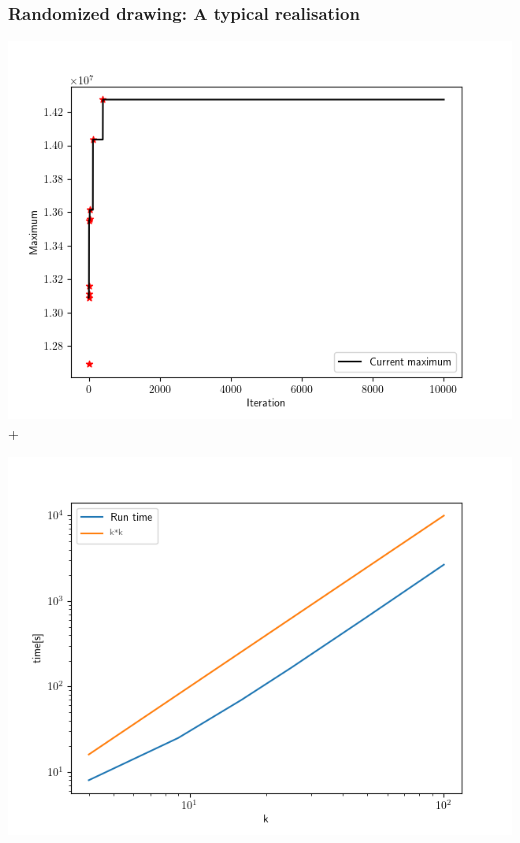 \documentclass[10pt,aspectratio=169,handout]{beamer}
\begin{document}
\begin{frame}
    \frametitle{Randomized drawing: A typical realisation}
    \begin{minipage}{0.49\textwidth}
        \includegraphics[width=\textwidth]{images/faces-10000-100_maximum.png}+
    \end{minipage}
    \begin{minipage}{0.49\textwidth}
        \includegraphics[width=\textwidth]{images/faces-100000_runtimes_new.png}
    \end{minipage}
\end{frame}
\end{document}
